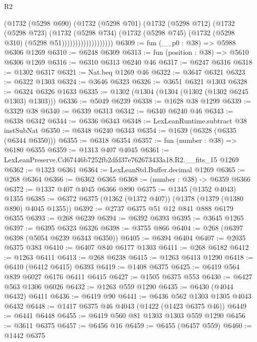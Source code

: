 \begin{lexlean}{R2}
\begin{coremodule}
                          (@1732
                            (@5298 @690)
                            (@1732
                              (@5298 @701)
                              (@1732
                                (@5298 @712)
                                (@1732
                                  (@5298 @723)
                                  (@1732
                                    (@5298 @734)
                                    (@1732
                                      (@5298 @745)
                                      (@1732 (@5298 @310) (@5298 @51)))))))))))))))))))
@6309 := fun (__p0 : @38) => @5988 @6306 @1269
@6310 := @6248 @6309
@6313 := fun (position : @38) => @5610 @6306 @1269
@6316 := @6310 @6313 @6240 @46
@6317 := @6247 @6316
@6318 := @1302 @6317
@6321 := Nat.beq @1269 @46
@6322 := @3647 @6321
@6323 := @6322 @1303
@6324 := @3646 @6323
@6326 := @3651 @6321 @1303
@6328 := @6324 @6326 @1633
@6335 := @1302 (@1304 (@1304 (@1302 (@1302 @6245 @1303) @1303)))
@6336 := @5049 @6239
@6338 := @1628 @38 @1299
@6339 := @3329 @38
@6340 := @6339 @6313
@6342 := @6340 @6240 @46
@6343 := @6338 @6342
@6344 := @6336 @6343
@6348 := LexLeanRuntime.subtract @38 instSubNat
@6350 := @6348 @6240 @6343
@6354 := @1639 (@6328 (@6335 (@6344 @6350)))
@6355 := @6318 @6354
@6357 := fun (number : @38) => @6180 @6355
@6359 := @1313 @407 @4045
@6361 := LexLeanPreserve.Cd67446b7252fb2dfd37e762673433a18.R2.__fits_15 @1269
@6362 := @1323 @6361
@6364 := LexLeanStd.Buffer.decimal @1269
@6365 := @268 @6364
@6366 := @6362 @6365
@6368 := (number : @38) -> @6359 @6366
@6372 := @1337 @407 @4045 @6366 @890
@6375 := @1345 (@1352 @4043) @1355
@6385 := @6372 @6375 (@1362 (@1372 @407)) (@1378 (@1379 (@1380 @890) @4045 @1355))
@6392 := @2737 @6375 @51 @12 @841 @888 @6179 @6355
@6393 := @268 @6239
@6394 := @6392 @6393
@6395 := @3645 @1265
@6397 := @6395 @6323 @6326
@6398 := @3755 @866
@6404 := @268 (@6397 @6398 (@5054 @6239 @6343 @6350))
@6405 := @6394 @6404
@6407 := @2035 @6375 @383
@6410 := @6407 @840 @6177 @1303
@6411 := @268 @6182
@6412 := @1263 @6411
@6413 := @268 @6238
@6415 := @1263 @6413 @1290
@6418 := @6410 (@6412 @6415) @6393
@6419 := @1408 @6375
@6425 := @6419 @564 @839 @6027 @6176 @6411 @6415
@6427 := @1505 @6375 @553
@6430 := @6427 @563 @1306 @6026
@6432 := @1263 @559 @1290
@6435 := @6430 (@4044 @6432) @6411
@6436 := @6419 @90
@6441 := @6436 @562 @1303 @1305 @4043 @6432
@6448 := @1417 @6375 @46 @4043 (@1422 (@1423 @6375 @46))
@6449 := @6441 @6448
@6455 := @6419 @560 @81 @1303 @1303 @559 @1290
@6456 := @3611 @6375
@6457 := @6456 @16
@6459 := @6455 (@6457 @559)
@6460 := @1442 @6375

\end{coremodule}
\end{lexlean}
